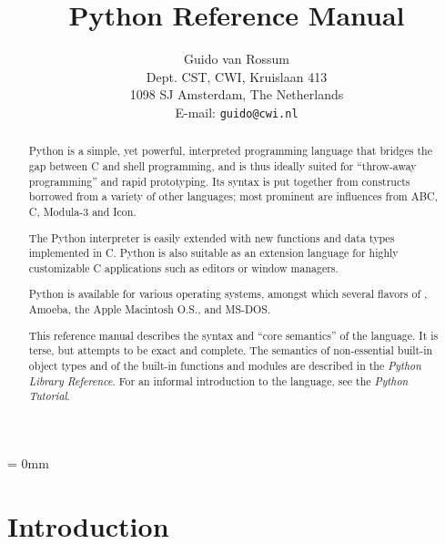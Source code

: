 
\title{\bf Python Reference Manual}

\author{
	Guido van Rossum \\
	Dept. CST, CWI, Kruislaan 413 \\
	1098 SJ Amsterdam, The Netherlands \\
	E-mail: {\tt guido@cwi.nl}
}




\maketitle

\begin{abstract}

\noindent
Python is a simple, yet powerful, interpreted programming language
that bridges the gap between C and shell programming, and is thus
ideally suited for ``throw-away programming'' and rapid prototyping.
Its syntax is put together from constructs borrowed from a variety of
other languages; most prominent are influences from ABC, C, Modula-3
and Icon.

The Python interpreter is easily extended with new functions and data
types implemented in C.  Python is also suitable as an extension
language for highly customizable C applications such as editors or
window managers.

Python is available for various operating systems, amongst which
several flavors of {\UNIX}, Amoeba, the Apple Macintosh O.S.,
and MS-DOS.

This reference manual describes the syntax and ``core semantics'' of
the language.  It is terse, but attempts to be exact and complete.
The semantics of non-essential built-in object types and of the
built-in functions and modules are described in the {\em Python
Library Reference}.  For an informal introduction to the language, see
the {\em Python Tutorial}.

\end{abstract}

\pagebreak

{
\parskip = 0mm
\tableofcontents
}

\pagebreak


\chapter{Introduction}

